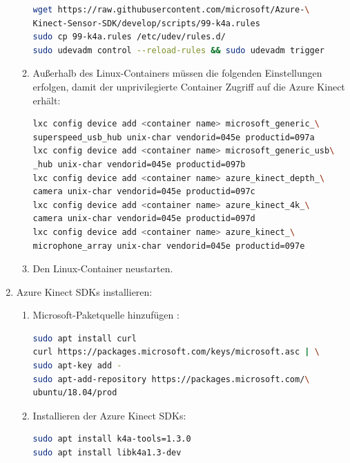 \begin{enumerate}[label*=\arabic*.]
\begin{enumerate}[label*=\arabic*.]
                \begin{lstlisting}[language=bash]
wget https://raw.githubusercontent.com/microsoft/Azure-\
Kinect-Sensor-SDK/develop/scripts/99-k4a.rules
sudo cp 99-k4a.rules /etc/udev/rules.d/
sudo udevadm control --reload-rules && sudo udevadm trigger
                \end{lstlisting}

            \item Außerhalb des Linux-Containers müssen die folgenden Einstellungen erfolgen, damit der unprivilegierte Container Zugriff auf die Azure Kinect erhält:
                \begin{lstlisting}[language=bash]
lxc config device add <container name> microsoft_generic_\
superspeed_usb_hub unix-char vendorid=045e productid=097a
lxc config device add <container name> microsoft_generic_usb\
_hub unix-char vendorid=045e productid=097b
lxc config device add <container name> azure_kinect_depth_\
camera unix-char vendorid=045e productid=097c
lxc config device add <container name> azure_kinect_4k_\
camera unix-char vendorid=045e productid=097d
lxc config device add <container name> azure_kinect_\
microphone_array unix-char vendorid=045e productid=097e
                \end{lstlisting}

            \item Den Linux-Container neustarten.
        \end{enumerate}

    \item Azure Kinect SDKs installieren:
        \begin{enumerate}[label*=\arabic*.]
            \item Microsoft-Paketquelle hinzufügen \cite{microsoftazure-kinect-sensor-sdk_installation_nodate}:
                \begin{lstlisting}[language=bash]
sudo apt install curl
curl https://packages.microsoft.com/keys/microsoft.asc | \
sudo apt-key add -
sudo apt-add-repository https://packages.microsoft.com/\
ubuntu/18.04/prod
                \end{lstlisting}

            \item Installieren der Azure Kinect SDKs:
                \begin{lstlisting}[language=bash]
sudo apt install k4a-tools=1.3.0
sudo apt install libk4a1.3-dev
                \end{lstlisting}


\end{enumerate}
\end{enumerate}
